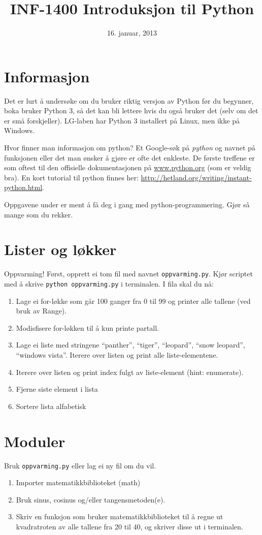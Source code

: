 \documentclass[12pt, norsk, a4paper]{exam}
\title{INF-1400 Introduksjon til Python}
\date{16. januar, 2013}
\begin{document}
\maketitle

\section*{Informasjon}
Det er lurt å undersøke om du bruker riktig versjon av Python før du begynner,
boka bruker Python 3, så det kan bli lettere hvis du også bruker det (selv om
det er små forskjeller). LG-laben har Python 3 installert på Linux, men ikke
på Windows.

Hvor finner man informasjon om python? Et Google-søk på \emph{python} og navnet
på funksjonen eller det man ønsker å gjøre er ofte det enkleste. De første
treffene er som oftest til den offisielle dokumentasjonen på
\url{www.python.org} (som er veldig bra). En kort tutorial til python finnes
her: \url{http://hetland.org/writing/instant-python.html}.

Oppgavene under er ment å få deg i gang med python-programmering. Gjør så mange
som du rekker.

\section{Lister og løkker}
Oppvarming! Først, opprett ei tom fil med navnet \texttt{oppvarming.py}. Kjør
scriptet med å skrive \texttt{python oppvarming.py} i terminalen. I fila skal du
nå:

\begin{enumerate}

\item Lage ei for-løkke som går 100 ganger fra 0 til 99 og printer alle tallene
(ved bruk av Range).
\item Modisfisere for-løkken til å kun printe partall. 
\item Lage ei liste med stringene “panther”, “tiger”, “leopard”, “snow leopard”,
“windows vista”. Iterere over listen og print alle liste-elementene. 
\item Iterere over listen og print index fulgt av liste-element (hint:
enumerate). 
\item Fjerne siste element i lista
\item
Sortere lista alfabetisk
\end{enumerate}

\section{Moduler}
Bruk \texttt{oppvarming.py} eller lag ei ny fil om du
vil.
\begin{enumerate}  
\item Importer matematikkbiblioteket (math)
\item Bruk sinus, cosinus og/eller tangensmetoden(e).
\item Skriv en funksjon som bruker matematikkbiblioteket til å regne ut
kvadratroten av alle tallene fra 20 til 40, og skriver disse ut i terminalen. 
\end{enumerate}
\end{document}
